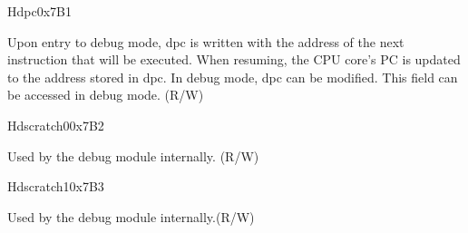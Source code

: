 \begin{register}{H}{dpc}{0x7B1}\label{regdesc:LPDPC}
%
\regnewline%
\begin{regdesc}\begin{reglist}
\label{dpcr}\item [dpc] Upon entry to debug mode, dpc is written with the address of the next instruction that will be executed. When resuming, the CPU core's PC is updated to the address stored in dpc. In debug mode, dpc can be modified. This field can be accessed in debug mode. (R/W)
\end{reglist}\end{regdesc}
\end{register}


\begin{register}{H}{dscratch0}{0x7B2}\label{regdesc:LPDSCRATCH0}
%
\regnewline%
\begin{regdesc}\begin{reglist}
\label{dscratch0}\item [dscratch0] Used by the debug module internally. (R/W)
\end{reglist}\end{regdesc}
\end{register}

\begin{register}{H}{dscratch1}{0x7B3}\label{regdesc:LPDSCRATCH1}
%
\regnewline%
\begin{regdesc}\begin{reglist}
\label{dscratch1}\item [dscratch1] Used by the debug module internally.(R/W)
\end{reglist}\end{regdesc}
\end{register}
